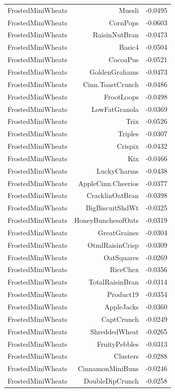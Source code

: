 \begin{longtable}{@{}lrr@{}}
FrostedMiniWheats & Muesli & -0.0495 \\
FrostedMiniWheats & CornPops & -0.0603 \\
FrostedMiniWheats & RaisinNutBran & -0.0473 \\
FrostedMiniWheats & Basic4 & -0.0504 \\
FrostedMiniWheats & CocoaPus & -0.0521 \\
FrostedMiniWheats & GoldenGrahams & -0.0473 \\
FrostedMiniWheats & Cinn.ToastCrunch & -0.0486 \\
FrostedMiniWheats & FrootLoops & -0.0498 \\
FrostedMiniWheats & LowFatGranola & -0.0369 \\
FrostedMiniWheats & Trix & -0.0526 \\
FrostedMiniWheats & Triples & -0.0307 \\
FrostedMiniWheats & Crispix & -0.0432 \\
FrostedMiniWheats & Kix & -0.0466 \\
FrostedMiniWheats & LuckyCharms & -0.0438 \\
FrostedMiniWheats & AppleCinn.Cheerios & -0.0377 \\
FrostedMiniWheats & CracklinOatBran & -0.0398 \\
FrostedMiniWheats & BigBiscuitShdWt & -0.0325 \\
FrostedMiniWheats & HoneyBunchesofOats & -0.0319 \\
FrostedMiniWheats & GreatGraines & -0.0304 \\
FrostedMiniWheats & OtmlRaisinCrisp & -0.0309 \\
FrostedMiniWheats & OatSquares & -0.0269 \\
FrostedMiniWheats & RiceChex & -0.0356 \\
FrostedMiniWheats & TotalRaisinBran & -0.0314 \\
FrostedMiniWheats & Product19 & -0.0354 \\
FrostedMiniWheats & AppleJacks & -0.0360 \\
FrostedMiniWheats & CaptCrunch & -0.0249 \\
FrostedMiniWheats & ShreddedWheat & -0.0265 \\
FrostedMiniWheats & FruityPebbles & -0.0313 \\
FrostedMiniWheats & Clusters & -0.0288 \\
FrostedMiniWheats & CinnamonMiniBuns & -0.0246 \\
FrostedMiniWheats & DoubleDipCrunch & -0.0258 \\

\end{longtable}
